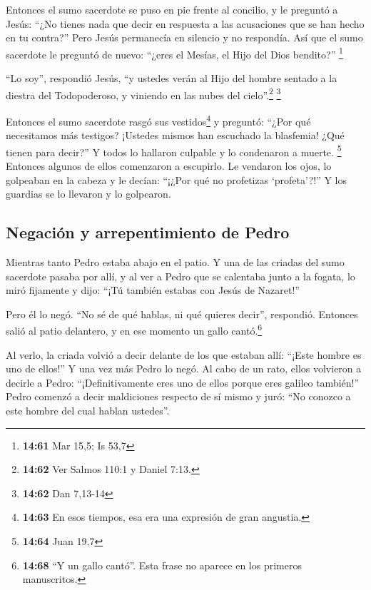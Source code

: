  Entonces el sumo sacerdote se puso en pie frente al
concilio, y le preguntó a Jesús: ``¿No tienes nada que decir en
respuesta a las acusaciones que se han hecho en tu contra?''
 Pero Jesús permanecía en silencio y no respondía. Así
que el sumo sacerdote le preguntó de nuevo: ``¿eres el Mesías, el Hijo
del Dios bendito?'' \footnote{\textbf{14:61} Mar 15,5; Is 53,7}

 ``Lo soy'', respondió Jesús, ``y ustedes verán al Hijo
del hombre sentado a la diestra del Todopoderoso, y viniendo en las
nubes del cielo''.\footnote{\textbf{14:62} Ver Salmos 110:1 y Daniel
  7:13.} \footnote{\textbf{14:62} Dan 7,13-14}

 Entonces el sumo sacerdote rasgó sus vestidos\footnote{\textbf{14:63}
  En esos tiempos, esa era una expresión de gran angustia.} y preguntó:
``¿Por qué necesitamos más testigos?  ¡Ustedes mismos han
escuchado la blasfemia! ¿Qué tienen para decir?'' Y todos lo hallaron
culpable y lo condenaron a muerte. \footnote{\textbf{14:64} Juan 19,7}
 Entonces algunos de ellos comenzaron a escupirlo. Le
vendaron los ojos, lo golpeaban en la cabeza y le decían: ``¡¿Por qué no
profetizas `profeta'?!'' Y los guardias se lo llevaron y lo golpearon.

\hypertarget{negaciuxf3n-y-arrepentimiento-de-pedro}{%
\subsection{Negación y arrepentimiento de
Pedro}\label{negaciuxf3n-y-arrepentimiento-de-pedro}}

 Mientras tanto Pedro estaba abajo en el patio. Y una de
las criadas del sumo sacerdote pasaba por allí,  y al ver
a Pedro que se calentaba junto a la fogata, lo miró fijamente y dijo:
``¡Tú también estabas con Jesús de Nazaret!''

 Pero él lo negó. ``No sé de qué hablas, ni qué quieres
decir'', respondió. Entonces salió al patio delantero, y en ese momento
un gallo cantó.\footnote{\textbf{14:68} ``Y un gallo cantó''. Esta frase
  no aparece en los primeros manuscritos.}

 Al verlo, la criada volvió a decir delante de los que
estaban allí: ``¡Este hombre es uno de ellos!''  Y una
vez más Pedro lo negó. Al cabo de un rato, ellos volvieron a decirle a
Pedro: ``¡Definitivamente eres uno de ellos porque eres galileo
también!''  Pedro comenzó a decir maldiciones respecto de
sí mismo y juró: ``No conozco a este hombre del cual hablan ustedes''.

